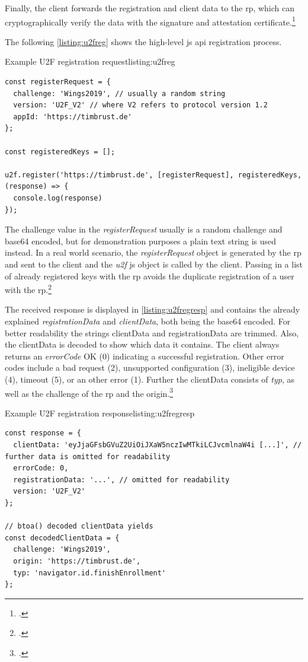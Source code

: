 Finally, the client forwards the registration and client data to the \gls{rp}, which can cryptographically verify the data with the signature and attestation certificate.\footcites[See][3]{7860546}

The following \autoref{listing:u2freg} shows the high-level \gls{js} \gls{api} registration process.
\\
\begin{example}{Example U2F registration request}{listing:u2freg}
\begin{verbatim}
const registerRequest = {
  challenge: 'Wings2019', // usually a random string
  version: 'U2F_V2' // where V2 refers to protocol version 1.2
  appId: 'https://timbrust.de'
};

const registeredKeys = [];

u2f.register('https://timbrust.de', [registerRequest], registeredKeys, (response) => {
  console.log(response)
});
\end{verbatim}
\end{example}

The challenge value in the \textit{registerRequest} usually is a random challenge and base64 encoded, but for demonstration purposes a plain text string is used instead. In a real world scenario, the \textit{registerRequest} object is generated by the \gls{rp} and sent to the client and the \textit{u2f} \gls{js} object is called by the client. Passing in a list of already registered keys with the \gls{rp} avoids the duplicate registration of a user with the \gls{rp}.\footcites[See][3]{u2f-js-api}[See][430]{10.1007/978-3-662-54970-4_25}

The received response is displayed in \autoref{listing:u2fregresp} and contains the already explained \textit{registrationData} and \textit{clientData}, both being  the base64 encoded. For better readability the strings clientData and registrationData are trimmed. Also, the clientData is decoded to show which data it contains. The client always returns an \textit{errorCode} OK (0) indicating a successful registration. Other error codes include a bad request (2), unsupported configuration (3), ineligible device (4), timeout (5), or an other error (1). Further the clientData consists of \textit{typ}, as well as the challenge of the \gls{rp} and the origin.\footcites[See][7]{u2f-js-api}[See][8]{u2f-raw-message}

\begin{example}{Example U2F registration response}{listing:u2fregresp}
\begin{verbatim}
const response = {
  clientData: 'eyJjaGFsbGVuZ2UiOiJXaW5nczIwMTkiLCJvcmlnaW4i [...]', // further data is omitted for readability
  errorCode: 0,
  registrationData: '...', // omitted for readability
  version: 'U2F_V2'
};

// btoa() decoded clientData yields
const decodedClientData = {
  challenge: 'Wings2019',
  origin: 'https://timbrust.de',
  typ: 'navigator.id.finishEnrollment'
};
\end{verbatim}
\end{example}

